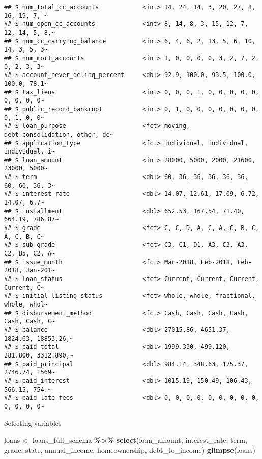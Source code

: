\documentclass[
]{article}
\newenvironment{Shaded}{\begin{snugshade}}{\end{snugshade}}
\newcommand{\FunctionTok}[1]{\textcolor[rgb]{0.13,0.29,0.53}{\textbf{#1}}}
\newcommand{\NormalTok}[1]{#1}
\newcommand{\OtherTok}[1]{\textcolor[rgb]{0.56,0.35,0.01}{#1}}
\newcommand{\SpecialCharTok}[1]{\textcolor[rgb]{0.81,0.36,0.00}{\textbf{#1}}}
\begin{document}
\begin{verbatim}
## $ num_total_cc_accounts            <int> 14, 24, 14, 3, 20, 27, 8, 16, 19, 7, ~
## $ num_open_cc_accounts             <int> 8, 14, 8, 3, 15, 12, 7, 12, 14, 5, 8,~
## $ num_cc_carrying_balance          <int> 6, 4, 6, 2, 13, 5, 6, 10, 14, 3, 5, 3~
## $ num_mort_accounts                <int> 1, 0, 0, 0, 0, 3, 2, 7, 2, 0, 2, 3, 3~
## $ account_never_delinq_percent     <dbl> 92.9, 100.0, 93.5, 100.0, 100.0, 78.1~
## $ tax_liens                        <int> 0, 0, 0, 1, 0, 0, 0, 0, 0, 0, 0, 0, 0~
## $ public_record_bankrupt           <int> 0, 1, 0, 0, 0, 0, 0, 0, 0, 0, 1, 0, 0~
## $ loan_purpose                     <fct> moving, debt_consolidation, other, de~
## $ application_type                 <fct> individual, individual, individual, i~
## $ loan_amount                      <int> 28000, 5000, 2000, 21600, 23000, 5000~
## $ term                             <dbl> 60, 36, 36, 36, 36, 36, 60, 60, 36, 3~
## $ interest_rate                    <dbl> 14.07, 12.61, 17.09, 6.72, 14.07, 6.7~
## $ installment                      <dbl> 652.53, 167.54, 71.40, 664.19, 786.87~
## $ grade                            <fct> C, C, D, A, C, A, C, B, C, A, C, B, C~
## $ sub_grade                        <fct> C3, C1, D1, A3, C3, A3, C2, B5, C2, A~
## $ issue_month                      <fct> Mar-2018, Feb-2018, Feb-2018, Jan-201~
## $ loan_status                      <fct> Current, Current, Current, Current, C~
## $ initial_listing_status           <fct> whole, whole, fractional, whole, whol~
## $ disbursement_method              <fct> Cash, Cash, Cash, Cash, Cash, Cash, C~
## $ balance                          <dbl> 27015.86, 4651.37, 1824.63, 18853.26,~
## $ paid_total                       <dbl> 1999.330, 499.120, 281.800, 3312.890,~
## $ paid_principal                   <dbl> 984.14, 348.63, 175.37, 2746.74, 1569~
## $ paid_interest                    <dbl> 1015.19, 150.49, 106.43, 566.15, 754.~
## $ paid_late_fees                   <dbl> 0, 0, 0, 0, 0, 0, 0, 0, 0, 0, 0, 0, 0~
\end{verbatim}

Selecting variables

\begin{Shaded}
\begin{Highlighting}[]
\NormalTok{loans }\OtherTok{\textless{}{-}}\NormalTok{ loans\_full\_schema }\SpecialCharTok{\%\textgreater{}\%}
\FunctionTok{select}\NormalTok{(loan\_amount, interest\_rate, term, grade,}
\NormalTok{state, annual\_income, homeownership, debt\_to\_income)}
\FunctionTok{glimpse}\NormalTok{(loans)}
\end{Highlighting}
\end{Shaded}
\end{document}
